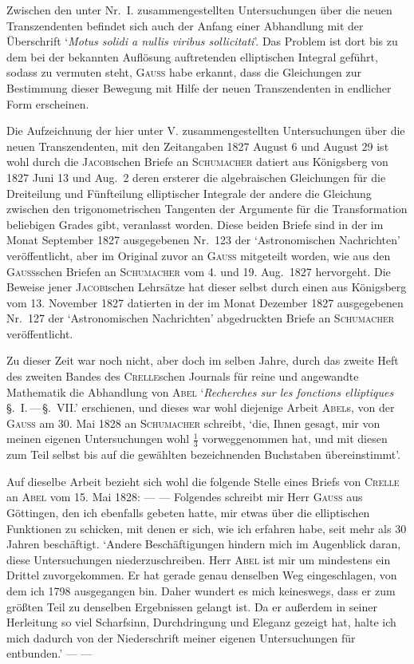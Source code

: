 \medskip
Zwischen den unter Nr.\ I. zusammengestellten Untersuchungen über die neuen Transzendenten befindet sich auch der Anfang einer Abhandlung mit der Überschrift ‘\textit{Motus solidi a nullis viribus sollicitati}’. Das Problem ist dort bis zu dem bei der bekannten Auflösung auftretenden elliptischen Integral geführt, sodass zu vermuten steht, \textsc{Gauss} habe erkannt, dass die Gleichungen zur Bestimmung dieser Bewegung mit Hilfe der neuen Transzendenten in endlicher Form erscheinen.

Die Aufzeichnung der hier unter V. zusammengestellten Untersuchungen über die neuen Transzendenten, mit den Zeitangaben 1827 August 6 und August 29 ist wohl durch die \textsc{Jacobi}schen Briefe an \textsc{Schumacher} datiert aus Königsberg von 1827 Juni 13 und Aug.\ 2 deren ersterer die algebraischen Gleichungen für die Dreiteilung und Fünfteilung elliptischer Integrale der andere die Gleichung zwischen den trigonometrischen Tangenten der Argumente für die Transformation beliebigen Grades gibt, veranlasst worden. Diese beiden Briefe sind in der im Monat September 1827 ausgegebenen Nr.\ 123 der ‘Astronomischen Nachrichten’ veröffentlicht, aber im Original zuvor an \textsc{Gauss} mitgeteilt worden, wie aus den \textsc{Gauss}schen Briefen an \textsc{Schumacher} vom 4. und 19. Aug.\ 1827 hervorgeht. Die Beweise jener \textsc{Jacobi}schen Lehrsätze hat dieser selbst durch einen aus Königsberg vom 13. November 1827 datierten in der im Monat Dezember 1827 ausgegebenen Nr.\ 127 der ‘Astronomischen Nachrichten’ abgedruckten Briefe an \textsc{Schumacher} veröffentlicht.

Zu dieser Zeit war noch nicht, aber doch im selben Jahre, durch das zweite Heft des zweiten Bandes des \textsc{Crelle}schen Journals für reine und angewandte Mathematik die Abhandlung von \textsc{Abel} ‘\textit{Recherches sur les fonctions elliptiques} \S.\ I.\,---\,\S.\ VII.’ erschienen, und dieses war wohl diejenige Arbeit \textsc{Abel}s, von der \textsc{Gauss} am 30. Mai 1828 an \textsc{Schumacher} schreibt, ‘die, Ihnen gesagt, mir von meinen eigenen Untersuchungen wohl \(\frac{1}{3}\) vorweggenommen hat, und mit diesen zum Teil selbst bis auf die gewählten bezeichnenden Buchstaben übereinstimmt’.

Auf dieselbe Arbeit bezieht sich wohl die folgende Stelle eines Briefs von \textsc{Crelle} an \textsc{Abel} vom 15. Mai 1828: --- --- Folgendes schreibt mir Herr \textsc{Gauss} aus Göttingen, den ich ebenfalls gebeten hatte, mir etwas über die elliptischen Funktionen zu schicken, mit denen er sich, wie ich erfahren habe, seit mehr als 30 Jahren beschäftigt. ‘Andere Beschäftigungen hindern mich im Augenblick daran, diese Untersuchungen niederzuschreiben. Herr \textsc{Abel} ist mir um mindestens ein Drittel zuvorgekommen. Er hat gerade genau denselben Weg eingeschlagen, von dem ich 1798 ausgegangen bin. Daher wundert es mich keineswegs, dass er zum größten Teil zu denselben Ergebnissen gelangt ist. Da er außerdem in seiner Herleitung so viel Scharfsinn, Durchdringung und Eleganz gezeigt hat, halte ich mich dadurch von der Niederschrift meiner eigenen Untersuchungen für entbunden.’ --- ---

